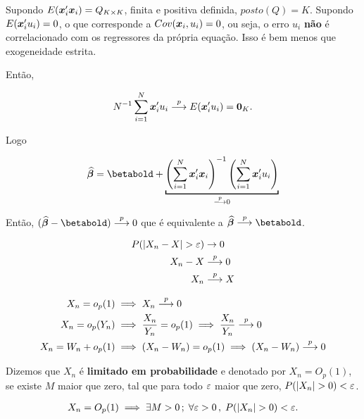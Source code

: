 \documentclass[11pt,oneside,a4paper]{article}
\numberwithin{equation}{section}
\begin{document}
\noindent
Supondo $E(\boldsymbol{x}_{i}' \boldsymbol{x}_{i}) = Q_{K \times K}$, finita e positiva definida, $posto(Q) = K$.
Supondo $E(\boldsymbol{x}_{i}' u_{i}) = 0$, o que corresponde a $Cov(\boldsymbol{x}_{i}, u_{i}) = 0$, ou seja, o erro $u_{i}$ \textbf{não} é correlacionado com os regressores da própria equação.
Isso é bem menos que exogeneidade estrita.

Então, 

\vspace{-1 em}
\begin{align*}
	N^{-1} \sum_{i=1}^{N} \boldsymbol{x}_{i}' u_{i}  \overset{p}{\longrightarrow}  E(\boldsymbol{x}_{i}' u_{i}) = \boldsymbol{0}_{K}.
\end{align*}

Logo

\vspace{-1 em}
\begin{align*}
\betahatbold = 
\betabold +
\underbracket[1pt]{
\left( \sum_{i=1}^{N} \mbs{x}_{i}' \mbs{x}_{i} \right)^{-1}
\left( \sum_{i=1}^{N} \mbs{x}_{i}' u_{i} \right)}_{\arrowp 0}
\end{align*}

Então, $(\betahatbold - \betabold) \arrowp 0$ que é equivalente a $\betahatbold \arrowp \betabold$.

\begin{def1}
\begin{align*}
P( | X_{n} - X | > \varepsilon ) & \to 0
\\
X_{n} - X &  \overset{p}{\longrightarrow}  0
\\
X_{n} &  \overset{p}{\longrightarrow}  X
\end{align*}
\end{def1}

\begin{def1}[$o_{p}$]
\begin{align*}
X_{n} = o_{p}(1) & \implies X_{n}  \overset{p}{\longrightarrow}  0
\\
X_{n} = o_{p}(Y_{n}) & \implies
\frac{X_{n}}{Y_{n}} = o_{p}(1) \implies
\frac{X_{n}}{Y_{n}}  \overset{p}{\longrightarrow}  0
\\
X_{n} = W_{n} + o_{p}(1) & \implies
(X_{n} - W_{n}) = o_{p}(1) \implies
(X_{n} - W_{n})  \overset{p}{\longrightarrow}  0
\end{align*}
\end{def1}

\begin{def1}
Dizemos que $X_{n}$ é \textbf{limitado em probabilidade} e denotado por 
$X_{n} = O_{p}(1)$,
se existe $M$ maior que zero, tal que para todo $\varepsilon$ maior que zero, $P( | X_{n} | > 0) < \varepsilon$.

\vspace{-1 em}
\begin{align*}
X_{n} = O_{p}(1) \implies \exists M > 0 \, ; \;
\forall \varepsilon > 0 \, , \;
P( | X_{n} | > 0) < \varepsilon.
\end{align*}
\end{def1}
\end{document}
